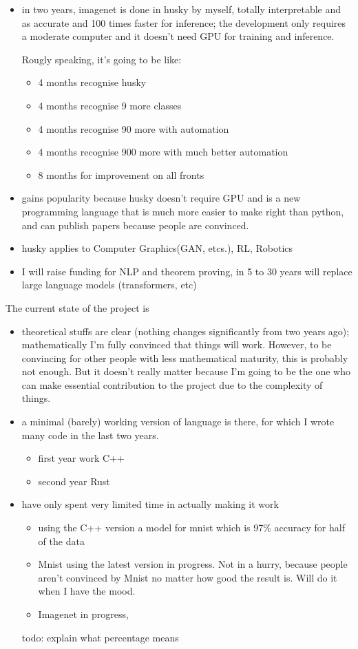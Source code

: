 \documentclass[11pt, oneside]{article}   	%
\theoremstyle{definition}
\begin{document}
\begin{itemize}
	\item in two years, imagenet is done in husky by myself, totally interpretable and as accurate and 100 times faster for inference; the development only requires a moderate computer and it doesn't need GPU for training and inference.

	Rougly speaking, it's going to be like:
		\begin{itemize}
			\item 4 months recognise husky
			\item 4 months recognise 9 more classes
			\item 4 months recognise 90 more with automation
			\item 4 months recognise 900 more with much better automation
			\item 8 months for improvement on all fronts
		\end{itemize}
	\item gains popularity because husky doesn't require GPU and is a new programming language that is much more easier to make right than python, and can publish papers because people are convinced.
	\item husky applies to Computer Graphics(GAN, etcs.), RL, Robotics
	\item I will raise funding for NLP and theorem proving, in 5 to 30 years will replace large language models (transformers, etc)
\end{itemize}

The current state of the project is
\begin{itemize}
	\item theoretical stuffs are clear (nothing changes significantly from two years ago); mathematically I'm fully convinced that things will work. However, to be convincing for other people with less mathematical maturity, this is probably not enough. But it doesn't really matter because I'm going to be the one who can make essential contribution to the project due to the complexity of things.
	\item a minimal (barely) working version of language is there, for which I wrote many code in the last two years.
	\begin{itemize}
		\item first year work C++
		\item second year Rust
	\end{itemize}
	\item have only spent very limited time in actually making it work
	\begin{itemize}
		\item using the C++ version a model for mnist which is 97\% accuracy for half of the data 
		\item Mnist using the latest version in progress. Not in a hurry, because people aren't convinced by Mnist no matter how good the result is. Will do it when I have the mood.
		\item Imagenet in progress, 
	\end{itemize}
\begin{rmk}
	todo: explain what percentage means
\end{rmk}
\end{itemize}
\end{document}
